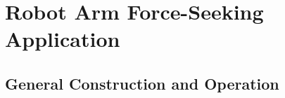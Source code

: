 %
    
\section{Robot Arm Force-Seeking Application}\label{sec:ftseekerapp}

\subsection{General Construction and Operation}

